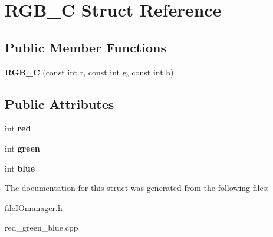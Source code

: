 \hypertarget{struct_r_g_b___c}{}\section{R\+G\+B\+\_\+C Struct Reference}
\label{struct_r_g_b___c}
\subsection*{Public Member Functions}
\begin{DoxyCompactItemize}
\item 
\hypertarget{struct_r_g_b___c_a16c521720fd720b4e6acc1342dc90a45}{}\label{struct_r_g_b___c_a16c521720fd720b4e6acc1342dc90a45} 
{\bfseries R\+G\+B\+\_\+C} (const int r, const int g, const int b)
\end{DoxyCompactItemize}
\subsection*{Public Attributes}
\begin{DoxyCompactItemize}
\item 
\hypertarget{struct_r_g_b___c_a1645fa3888d6fc44a7b2b020e2e77e64}{}\label{struct_r_g_b___c_a1645fa3888d6fc44a7b2b020e2e77e64} 
int {\bfseries red}
\item 
\hypertarget{struct_r_g_b___c_aeef3d1ade2a3186a4f0946aeb3a5a0d5}{}\label{struct_r_g_b___c_aeef3d1ade2a3186a4f0946aeb3a5a0d5} 
int {\bfseries green}
\item 
\hypertarget{struct_r_g_b___c_a1d9f5acccd1f07b2616e5b18101b50f2}{}\label{struct_r_g_b___c_a1d9f5acccd1f07b2616e5b18101b50f2} 
int {\bfseries blue}
\end{DoxyCompactItemize}


The documentation for this struct was generated from the following files\+:\begin{DoxyCompactItemize}
\item 
file\+I\+Omanager.\+h\item 
red\+\_\+green\+\_\+blue.\+cpp\end{DoxyCompactItemize}
